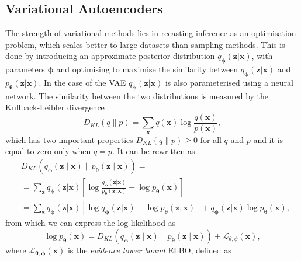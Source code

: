 \documentclass[final,3p,times,twocolumn]{elsarticle}
\begin{document}
\subsection{Variational Autoencoders}
\label{sec:ELBO}
The strength of variational methods lies in recasting inference as an optimisation problem, which scales better to large datasets than sampling methods. This is done by introducing an approximate posterior distribution $q_{\boldsymbol{\phi}}(\mathbf{z} | \mathbf{x})$, with parameters $\boldsymbol{\phi}$ and optimising to maximise the similarity between $q_{\boldsymbol{\phi}}(\mathbf{z} | \mathbf{x})$ and $p_{\boldsymbol{\theta}}(\mathbf{z} | \mathbf{x})$. In the case of the VAE $q_{\boldsymbol{\phi}}(\mathbf{z} | \mathbf{x})$ is also parameterised using a neural network. The similarity between the two distributions is measured by the Kullback-Leibler divergence 
\begin{equation}
	D_{KL}(q \| p)=\sum_{\mathbf{x}} q(\mathbf{x}) \log \frac{q(\mathbf{x})}{p(\mathbf{x})},
\end{equation}
which has two important properties $D_{KL}(q \| p) \geq 0$ for all $q$ and $p$ and it is equal to zero only when $q = p$. It can be rewritten as
\begin{equation}
	\begin{aligned}
		&D_{K L}(q_{\boldsymbol{\phi}}(\mathbf{z} \mid \mathbf{x}) \| p_{\boldsymbol{\theta}}(\mathbf{z} \mid \mathbf{x})) = \\ 
		&= \sum_{\mathbf{z}} q_{\boldsymbol{\phi}}(\mathbf{z} | \mathbf{x})\left[\log \frac{q_{\boldsymbol{\phi}}(\mathbf{z} | \mathbf{x})}{p_{\boldsymbol{\theta}}(\mathbf{z}, \mathbf{x})}+\log p_{\boldsymbol{\theta}}(\mathbf{x})\right]  \\
		&= \sum_{\mathbf{z}} q_{\boldsymbol{\phi}}(\mathbf{z} | \mathbf{x})\left[\log q_{\boldsymbol{\phi}}(\mathbf{z} | \mathbf{x}) - \log p_{\boldsymbol{\theta}}(\mathbf{z}, \mathbf{x}) \right] + q_{\boldsymbol{\phi}}(\mathbf{z} | \mathbf{x}) \log p_{\boldsymbol{\theta}}(\mathbf{x}),
	\end{aligned}
\end{equation}
from which we can express the log likelihood as
\begin{equation}
	\label{eq:logpELBO}
	\log p_{\boldsymbol{\theta}}(\mathbf{x}) = D_{K L}(q_{\boldsymbol{\phi}}(\mathbf{z} \mid \mathbf{x}) \| p_{\boldsymbol{\theta}}(\mathbf{z} \mid \mathbf{x})) + \mathcal{L}_{\theta, \phi}(\mathbf{x}),
\end{equation}
where $\mathcal{L}_{\boldsymbol{\theta}, \boldsymbol{\phi}}(\mathbf{x})$ is the \emph{evidence lower bound} ELBO, defined as
\end{document}
